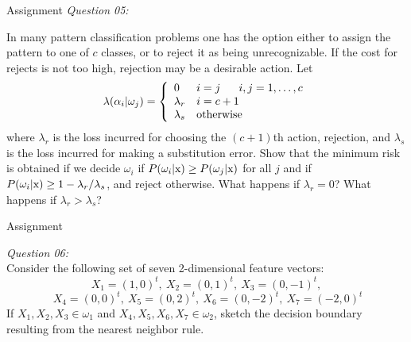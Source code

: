 \begin{frame}{Assignment}
\textit{\color{slidecolor}Question 05:}\\
\begin{footnotesize}
In many pattern classification problems one has the option either to assign the pattern to one of $c$ classes, or to reject it as being unrecognizable. If the cost for rejects is not too high, rejection may be a desirable action. Let
\begin{equation}
\lambda ({\alpha _i}|{\omega _j}) = \left\{ {\begin{array}{*{30}{l}}
0&{i = j~~~~~i,j = 1, \ldots ,c}\\
{{\lambda _r}}&{i = c + 1}\\
{{\lambda _s}}&{\rm otherwise}
\end{array}} \right. \nonumber
\end{equation}
where $\lambda_r$ is the loss incurred for choosing the $(c+1)$th action, rejection, and $\lambda_s$ is the loss incurred for making a substitution error. Show that the minimum risk is obtained if we decide $\omega_i$ if $P(\omega_i|{\rm x})\geq P(\omega_j|{\rm x})$ for all $j$ and if $P(\omega_i|{\rm x})\geq 1- \lambda_r/\lambda_s$, and reject otherwise. What happens if $\lambda_r=0$? What happens if $\lambda_r>\lambda_s$?
\end{footnotesize}
\end{frame}

\begin{frame}{Assignment}
\begin{footnotesize}
\textit{\color{slidecolor}Question 06:}\\
Consider the following set of seven 2-dimensional feature vectors:
\begin{equation}
X_1=(1,0)^t,~X_2=(0,1)^t,~X_3=(0,-1)^t, \nonumber
\end{equation}
\begin{equation}
 ~X_4=(0,0)^t,~X_5=(0,2)^t,~X_6=(0,-2)^t, ~X_7=(-2,0)^t\nonumber
\end{equation}
If $X_1,X_2,X_3\in \omega_1$ and $X_4,X_5,X_6,X_7\in \omega_2$, sketch the decision boundary resulting from the nearest neighbor rule.
\end{footnotesize}
\end{frame}


